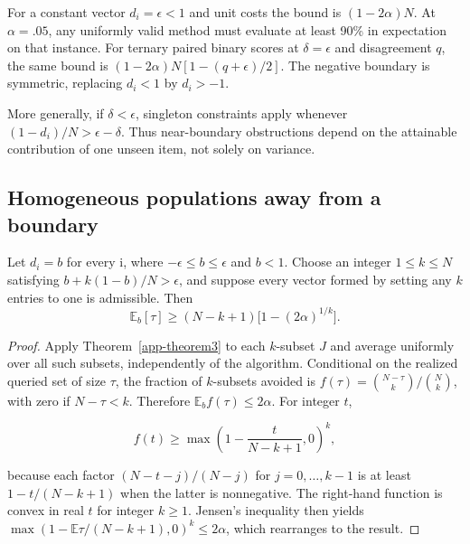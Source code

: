 For a constant vector \(d_i=\epsilon<1\) and unit costs the bound is \((1-2\alpha)N\). At \(\alpha=.05\), any uniformly valid method must evaluate at least 90\% in expectation on that instance. For ternary paired binary scores at \(\delta=\epsilon\) and disagreement \(q\), the same bound is \((1-2\alpha)N[1-(q+\epsilon)/2]\). The negative boundary is symmetric, replacing \(d_i<1\) by \(d_i>-1\).

More generally, if \(\delta<\epsilon\), singleton constraints apply whenever \((1-d_i)/N>\epsilon-\delta\). Thus near-boundary obstructions depend on the attainable contribution of one unseen item, not solely on variance.

\subsection{Homogeneous populations away from a boundary}\label{theory:6}

\begin{theorem}\label{app-theorem4} Let \(d_i=b\) for every i, where \(-\epsilon\le b\le\epsilon\) and \(b<1\). Choose an integer \(1\le k\le N\) satisfying \(b+k(1-b)/N>\epsilon\), and suppose every vector formed by setting any \(k\) entries to one is admissible. Then
\begin{equation}\label{eq:proofs-7}
\mathbb E_b[\tau]\ge(N-k+1)\bigl[1-(2\alpha)^{1/k}\bigr].
\end{equation}
\end{theorem}

\begin{proof} Apply Theorem~\ref{app-theorem3} to each \(k\)-subset \(J\) and average uniformly over all such subsets, independently of the algorithm. Conditional on the realized queried set of size \(\tau\), the fraction of \(k\)-subsets avoided is \(f(\tau)=\binom{N-\tau}{k}/\binom Nk\), with zero if \(N-\tau<k\). Therefore \(\mathbb E_b f(\tau)\le2\alpha\). For integer \(t\),

\begin{equation}\label{eq:proofs-8}
f(t)\ge\max\left(1-\frac{t}{N-k+1},0\right)^k,
\end{equation}

because each factor \((N-t-j)/(N-j)\) for \(j=0,\ldots,k-1\) is at least \(1-t/(N-k+1)\) when the latter is nonnegative. The right-hand function is convex in real \(t\) for integer \(k\ge 1\). Jensen's inequality then yields \(\max(1-\mathbb E\tau/(N-k+1),0)^k\le2\alpha\), which rearranges to the result. \end{proof}

